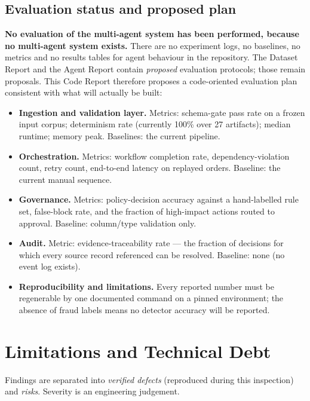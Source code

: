 \documentclass[11pt,a4paper]{article}
\begin{document}
\subsection{Evaluation status and proposed plan}
\textbf{No evaluation of the multi-agent system has been performed, because no multi-agent system exists.} There are no experiment logs, no baselines, no metrics and no results tables for agent behaviour in the repository. The Dataset Report and the Agent Report contain \emph{proposed} evaluation protocols; those remain proposals. This Code Report therefore proposes a code-oriented evaluation plan consistent with what will actually be built:
\begin{itemize}
\item \textbf{Ingestion and validation layer.} Metrics: schema-gate pass rate on a frozen input corpus; determinism rate (currently 100\% over 27 artifacts); median runtime; memory peak. Baselines: the current pipeline.
\item \textbf{Orchestration.} Metrics: workflow completion rate, dependency-violation count, retry count, end-to-end latency on replayed orders. Baseline: the current manual sequence.
\item \textbf{Governance.} Metrics: policy-decision accuracy against a hand-labelled rule set, false-block rate, and the fraction of high-impact actions routed to approval. Baseline: column/type validation only.
\item \textbf{Audit.} Metric: evidence-traceability rate --- the fraction of decisions for which every source record referenced can be resolved. Baseline: none (no event log exists).
\item \textbf{Reproducibility and limitations.} Every reported number must be regenerable by one documented command on a pinned environment; the absence of fraud labels means no detector accuracy will be reported.
\end{itemize}

\section{Limitations and Technical Debt}
\label{sec:limits}
Findings are separated into \emph{verified defects} (reproduced during this inspection) and \emph{risks}. Severity is an engineering judgement.
\end{document}
